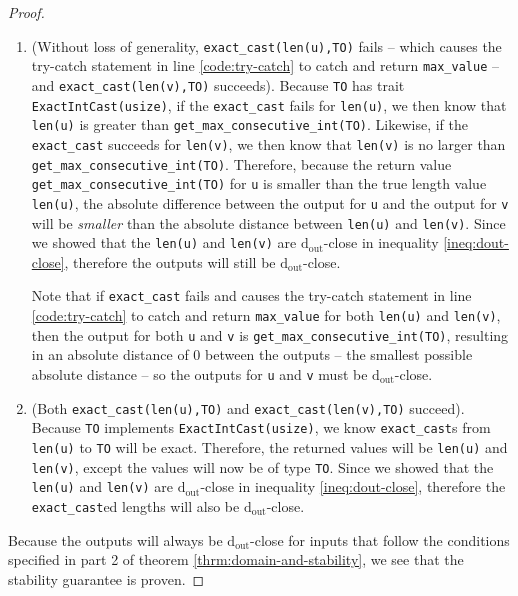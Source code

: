 \documentclass[11pt,letterpaper]{article}
\newcommand{\dout}{\mathrm{d_{out}}}
\theoremstyle{definition}
\begin{document}
\begin{proof}
\begin{enumerate}
    \item (Without loss of generality, \texttt{exact\_cast(len(u),TO)} fails -- which causes the try-catch statement in line \ref{code:try-catch} to catch and return \texttt{max\_value} -- and \texttt{exact\_cast(len(v),TO)} succeeds). Because \texttt{TO} has trait \texttt{ExactIntCast(usize)}, if the \texttt{exact\_cast} fails for \texttt{len(u)}, we then know that \texttt{len(u)} is greater than \texttt{get\_max\_consecutive\_int(TO)}. Likewise, if the \texttt{exact\_cast} succeeds for \texttt{len(v)}, we then know that \texttt{len(v)} is no larger than \texttt{get\_max\_consecutive\_int(TO)}. Therefore, because the return value  \texttt{get\_max\_consecutive\_int(TO)} for \texttt{u} is smaller than the true length value \texttt{len(u)}, the absolute difference between the output for \texttt{u} and the output for \texttt{v} will be \emph{smaller} than the absolute distance between \texttt{len(u)} and \texttt{len(v)}. Since we showed that the \texttt{len(u)} and \texttt{len(v)} are $\dout$-close in inequality \ref{ineq:dout-close}, therefore the outputs will still be $\dout$-close.
    
    Note that if \texttt{exact\_cast} fails and causes the try-catch statement in line \ref{code:try-catch} to catch and return \texttt{max\_value} for both \texttt{len(u)} and \texttt{len(v)}, then the output for both \texttt{u} and \texttt{v} is \texttt{get\_max\_consecutive\_int(TO)}, resulting in an absolute distance of 0 between the outputs -- the smallest possible absolute distance -- so the outputs for \texttt{u} and \texttt{v} must be $\dout$-close.
    
    \item (Both \texttt{exact\_cast(len(u),TO)} and \texttt{exact\_cast(len(v),TO)} succeed). Because \texttt{TO} implements \texttt{ExactIntCast(usize)}, we know \texttt{exact\_cast}s from \texttt{len(u)} to \texttt{TO} will be exact. Therefore, the returned values will be \texttt{len(u)} and \texttt{len(v)}, except the values will now be of type \texttt{TO}. Since we showed that the \texttt{len(u)} and \texttt{len(v)} are $\dout$-close in inequality \ref{ineq:dout-close}, therefore the \texttt{exact\_cast}ed lengths will also be $\dout$-close.
\end{enumerate}

Because the outputs will always be $\dout$-close for inputs that follow the conditions specified in part 2 of theorem \ref{thrm:domain-and-stability}, we see that the stability guarantee is proven.

\end{proof}
\end{document}
